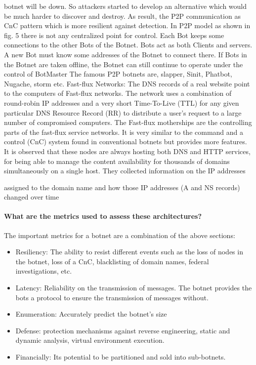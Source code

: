 botnet will be down. So attackers started to develop an
alternative which would be much harder to discover and
destroy. As result, the P2P communication as CnC pattern
which is more resilient against detection. In P2P model as
shown in fig. 5 there is not any centralized point for control.
Each Bot keeps some connections to the other Bots of the
Botnet. Bots act as both Clients and servers. A new Bot must
know some addresses of the Botnet to connect there. If Bots
in the Botnet are taken offline, the Botnet can still continue to
operate under the control of BotMaster
The famous P2P botnets are, slapper, Sinit, Phatbot,
Nugache, storm etc.
Fast-flux Networks:
The DNS records of a real website point to the computers of
Fast-flux networks. The network uses a combination of
round-robin IP addresses and a very short Time-To-Live
(TTL) for any given particular DNS Resource Record (RR)
to distribute a user’s request to a large number of
compromised computers. The Fast-flux motherships are the
controlling parts of the fast-flux service networks. It is very
similar to the command and a control (CnC) system found in
conventional botnets but provides more features. It is
observed that these nodes are always hosting both DNS and
HTTP services, for being able to manage the content
availability for thousands of domains simultaneously on a
single host. They collected information on the IP addresses 

assigned to the domain name and how those IP addresses (A
and NS records) changed over time

\paragraph{What are the metrics used to assess these architectures?}
The important metrics for a botnet are a combination of the above sections:
\begin{itemize}
\item Resiliency: The ability to resist different events such as the loss of nodes in the botnet, loss of a CnC, blacklisting of domain names, federal investigations, etc.
\item Latency: Reliability on the transmission of messages. The botnet provides the bots a protocol to ensure the transmission of messages without.
\item Enumeration: Accurately predict the botnet's size
\item Defense: protection mechanisms against reverse engineering, static and dynamic analysis, virtual environment execution.
\item Financially: Its potential to be partitioned and sold into sub-botnets. 
\end{itemize}


